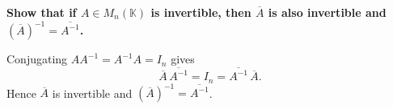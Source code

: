 \providecommand{\rank}{\operatorname{r}}
\providecommand{\RR}{\mathbb R}
\providecommand{\CC}{\mathbb C}
\providecommand{\KK}{\mathbb K}

\setcounter{enumi}{22}
\item {\bfseries\boldmath
Show that if $A\in M_n(\KK)$ is invertible, then $\overline A$ is also invertible and $(\overline A)^{-1}=\overline{A^{-1}}$.
}

\begin{answer}
Conjugating $AA^{-1}=A^{-1}A=I_n$ gives
\[
 \overline A\,\overline{A^{-1}}=I_n
 =\overline{A^{-1}}\,\overline A.
\]
Hence $\overline A$ is invertible and
$(\overline A)^{-1}=\overline{A^{-1}}$.
\end{answer}
